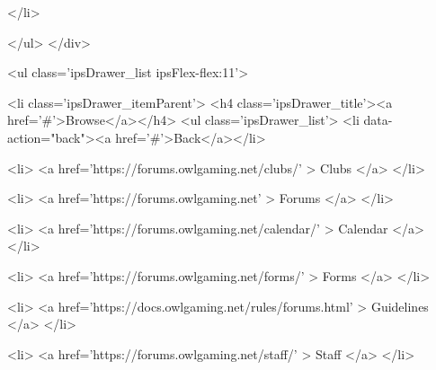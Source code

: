 							</li>
						
					</ul>
				</div>
			

			<ul class='ipsDrawer_list ipsFlex-flex:11'>
				

				
				
				
				
					
						
						
							<li class='ipsDrawer_itemParent'>
								<h4 class='ipsDrawer_title'><a href='#'>Browse</a></h4>
								<ul class='ipsDrawer_list'>
									<li data-action="back"><a href='#'>Back</a></li>
									
									
										
										
										
											
												
											
										
											
												
													
													
									
													
									
									
									
										


	
		
			<li>
				<a href='https://forums.owlgaming.net/clubs/' >
					Clubs
				</a>
			</li>
		
	

	
		
			<li>
				<a href='https://forums.owlgaming.net' >
					Forums
				</a>
			</li>
		
	

	
		
			<li>
				<a href='https://forums.owlgaming.net/calendar/' >
					Calendar
				</a>
			</li>
		
	

	
		
			<li>
				<a href='https://forums.owlgaming.net/forms/' >
					Forms
				</a>
			</li>
		
	

	
		
			<li>
				<a href='https://docs.owlgaming.net/rules/forums.html' >
					Guidelines
				</a>
			</li>
		
	

	
		
			<li>
				<a href='https://forums.owlgaming.net/staff/' >
					Staff
				</a>
			</li>
		
	

